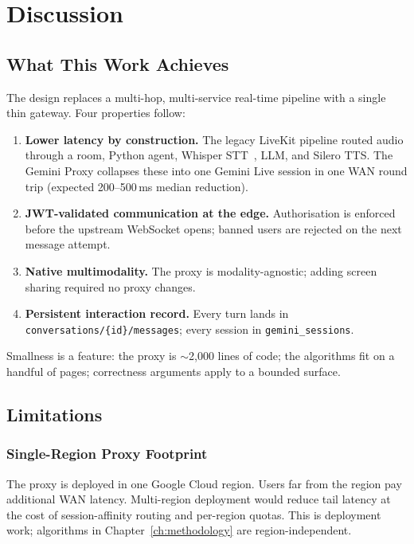 \chapter{Discussion}
\label{ch:discussion}

\section{What This Work Achieves}
\label{sec:achieves}

The design replaces a multi-hop, multi-service real-time pipeline with a single thin gateway. Four properties follow:
\begin{enumerate}
    \item \textbf{Lower latency by construction.} The legacy LiveKit pipeline routed audio through a room, Python agent, Whisper STT~\cite{radford2022whisper}, LLM, and Silero TTS. The Gemini Proxy collapses these into one Gemini Live session in one WAN round trip (expected 200--500\,ms median reduction).
    \item \textbf{JWT-validated communication at the edge.} Authorisation is enforced before the upstream WebSocket opens; banned users are rejected on the next message attempt.
    \item \textbf{Native multimodality.} The proxy is modality-agnostic; adding screen sharing required no proxy changes.
    \item \textbf{Persistent interaction record.} Every turn lands in \texttt{conversations/\{id\}/messages}; every session in \texttt{gemini\_sessions}.
\end{enumerate}

Smallness is a feature: the proxy is $\sim$2,000 lines of code; the algorithms fit on a handful of pages; correctness arguments apply to a bounded surface.

\section{Limitations}
\label{sec:limitations}

\subsection{Single-Region Proxy Footprint}
\label{sec:limit-region}

The proxy is deployed in one Google Cloud region. Users far from the region pay additional WAN latency. Multi-region deployment would reduce tail latency at the cost of session-affinity routing and per-region quotas. This is deployment work; algorithms in Chapter~\ref{ch:methodology} are region-independent.

